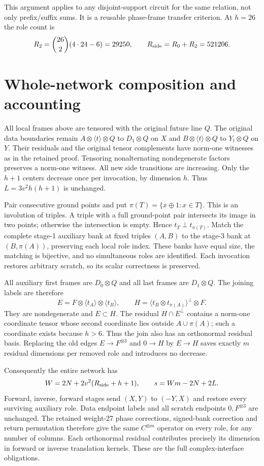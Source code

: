 This argument applies to any disjoint-support circuit for the same relation,
not only prefix/suffix sums. It is a reusable phase-frame transfer criterion.
At $h=26$ the role count is
\[
 R_2=\binom{26}{2}(4\cdot24-6)=29250,
 \qquad R_{\rm side}=R_0+R_2=521206.
\]

\section{Whole-network composition and accounting}
All local frames above are tensored with the original future line $Q$.
The original data boundaries remain
$A\otimes\langle t\rangle\otimes Q$ to $D_1\otimes Q$ on $X$ and
$B\otimes\langle t\rangle\otimes Q$ to $Y_t\otimes Q$ on $Y$.
Their residuals and the original tensor complements have norm-one witnesses
as in the retained proof. Tensoring nonalternating nondegenerate factors
preserves a norm-one witness. All new side transitions are increasing.
Only the $h+1$ centers decrease once per invocation, by dimension $h$.
Thus $L=3v^2h(h+1)$ is unchanged.

Pair consecutive ground points and put $\pi(T)=\{x\mathbin\oplus1:x\in T\}$.
This is an involution of triples. A triple with a full ground-point pair
intersects its image in two points; otherwise the intersection is empty.
Hence $t_T\perp t_{\pi(T)}$. Match the complete stage-1 auxiliary bank
at fixed triples $(A,B)$ to the stage-3 bank at $(B,\pi(A))$, preserving
each local role index. These banks have equal size, the matching is bijective,
and no simultaneous roles are identified. Each invocation restores arbitrary
scratch, so its scalar correctness is preserved.

All auxiliary first frames are $D_0\otimes Q$ and all last frames are
$D_1\otimes Q$. The joining labels are therefore
\[
 E=F\otimes\langle t_A\rangle\otimes\langle t_B\rangle,
 \qquad H=\langle t_B\otimes t_{\pi(A)}\rangle^\perp\otimes F.
\]
They are nondegenerate and $E\subset H$. The residual $H\cap E^\perp$
contains a norm-one coordinate tensor whose second coordinate lies outside
$A\cup\pi(A)$; such a coordinate exists because $h>6$. Thus the join
also has an orthonormal residual basis. Replacing the old edges
$E\to F^{\otimes3}$ and $0\to H$ by $E\to H$ saves exactly $m$
residual dimensions per removed role and introduces no decrease.

Consequently the entire network has
\[
 W=2N+2v^2(R_{\rm side}+h+1),\qquad s=Wm-2N+2L.
\]
Forward, inverse, forward stages send $(X,Y)$ to $(-Y,X)$ and restore every
surviving auxiliary role. Data endpoint labels and all scratch endpoints
$0,F^{\otimes3}$ are unchanged. The retained weight-27 phase corrections,
signed-bank correction and return permutation therefore give the same
$C^{\otimes m}$ operator on every role, for any number of columns. Each
orthonormal residual contributes precisely its dimension in forward or
inverse translation kernels. These are the full complex-interface obligations.

